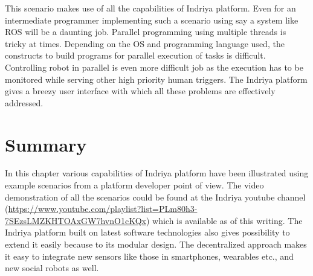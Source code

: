 This scenario makes use of all the capabilities of Indriya platform. Even for an intermediate programmer implementing such a scenario using say a system like ROS \cite{quigley2009ros} will be a daunting job. Parallel programming using multiple threads is tricky at times. Depending on the OS and programming language used, the constructs to build programs for parallel execution of tasks is difficult. Controlling robot in parallel is even more difficult job as the execution has to be monitored while serving other high priority human triggers. The Indriya platform gives a breezy user interface with which all these problems are effectively addressed.

\section{Summary}
In this chapter various capabilities of Indriya platform have been illustrated using example scenarios from a platform developer point of view. The video demonstration of all the scenarios could be found at the Indriya youtube channel (\url{https://www.youtube.com/playlist?list=PLm80h3-7SEzsLMZKHTOAxGW7hvnO1cKQx}) which is available as of this writing.
The Indriya platform built on latest software technologies also gives possibility to extend it easily because to its modular design. The decentralized approach makes it easy to integrate new sensors like those in smartphones, wearables etc., and new social robots as well. 